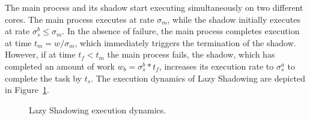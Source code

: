 The main process and its shadow start executing simultaneously on two different cores. The main process executes at rate $\sigma_m$, while the shadow initially executes at rate $\sigma_s^b \le \sigma_m$. %
In the absence of failure, the main process completes execution at time 
$t_m = w/\sigma_m$, which immediately triggers the termination of the
shadow. However, if at time $t_f < t_m$ the main process fails, the shadow, which has completed an amount of work $w_b=\sigma_s^b * t_f$, increases its execution rate to $\sigma_s^a$ to complete the task by $t_s$. %
The execution dynamics of Lazy Shadowing are depicted in Figure~\ref{fig:sync}.

\begin{figure}[!t]
	\begin{center}
	\end{center}
	\caption{Lazy Shadowing execution dynamics.}
	\label{fig:sync}
\end{figure}

